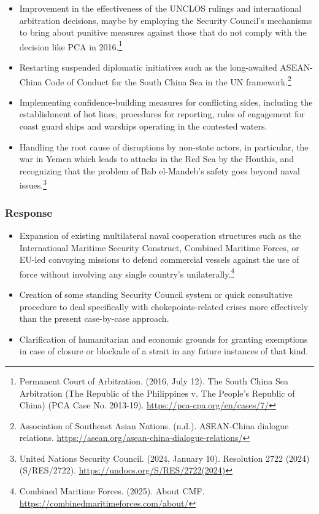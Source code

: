 \begin{itemize}
  \item Improvement in the effectiveness of the UNCLOS rulings and international arbitration decisions, maybe by employing the Security Council's mechanisms to bring about punitive measures against those that do not comply with the decision like PCA in 2016.\footnote{Permanent Court of Arbitration. (2016, July 12). The South China Sea Arbitration (The Republic of the Philippines v. The People's Republic of China) (PCA Case No. 2013-19). \url{https://pca-cpa.org/en/cases/7/}}
  \item Restarting suspended diplomatic initiatives such as the long-awaited ASEAN-China Code of Conduct for the South China Sea in the UN framework.\footnote{Association of Southeast Asian Nations. (n.d.). ASEAN-China dialogue relations. \url{https://asean.org/asean-china-dialogue-relations/}}
  \item Implementing confidence-building measures for conflicting sides, including the establishment of hot lines, procedures for reporting, rules of engagement for coast guard ships and warships operating in the contested waters.
  \item Handling the root cause of disruptions by non-state actors, in particular, the war in Yemen which leads to attacks in the Red Sea by the Houthis, and recognizing that the problem of Bab el-Mandeb's safety goes beyond naval issues.\footnote{United Nations Security Council. (2024, January 10). Resolution 2722 (2024) (S/RES/2722). \url{https://undocs.org/S/RES/2722(2024)}}
\end{itemize}

\subsubsection{Response}

\begin{itemize}
  \item Expansion of existing multilateral naval cooperation structures such as the International Maritime Security Construct, Combined Maritime Forces, or EU-led convoying missions to defend commercial vessels against the use of force without involving any single country's unilaterally.\footnote{Combined Maritime Forces. (2025). About CMF. \url{https://combinedmaritimeforces.com/about/}}
  \item Creation of some standing Security Council system or quick consultative procedure to deal specifically with chokepoints-related crises more effectively than the present case-by-case approach.
  \item Clarification of humanitarian and economic grounds for granting exemptions in case of closure or blockade of a strait in any future instances of that kind.
\end{itemize}

